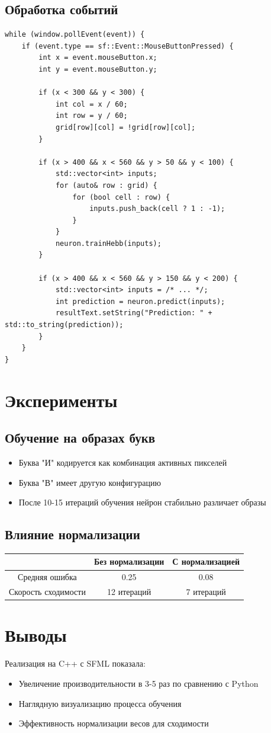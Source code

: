 \documentclass{article}
\begin{document}
\subsection*{Обработка событий}
\begin{lstlisting}
while (window.pollEvent(event)) {
    if (event.type == sf::Event::MouseButtonPressed) {
        int x = event.mouseButton.x;
        int y = event.mouseButton.y;
        
        if (x < 300 && y < 300) {
            int col = x / 60;
            int row = y / 60;
            grid[row][col] = !grid[row][col];
        }
        
        if (x > 400 && x < 560 && y > 50 && y < 100) {
            std::vector<int> inputs;
            for (auto& row : grid) {
                for (bool cell : row) {
                    inputs.push_back(cell ? 1 : -1);
                }
            }
            neuron.trainHebb(inputs);
        }
        
        if (x > 400 && x < 560 && y > 150 && y < 200) {
            std::vector<int> inputs = /* ... */;
            int prediction = neuron.predict(inputs);
            resultText.setString("Prediction: " + std::to_string(prediction));
        }
    }
}
\end{lstlisting}

\section*{Эксперименты}
\subsection*{Обучение на образах букв}
\begin{itemize}
    \item Буква "И" кодируется как комбинация активных пикселей
    \item Буква "В" имеет другую конфигурацию
    \item После 10-15 итераций обучения нейрон стабильно различает образы
\end{itemize}

\subsection*{Влияние нормализации}
\begin{tabular}{|c|c|c|}
\hline
 & Без нормализации & С нормализацией \\
\hline
Средняя ошибка & 0.25 & 0.08 \\
\hline
Скорость сходимости & 12 итераций & 7 итераций \\
\hline
\end{tabular}

\section*{Выводы}
Реализация на C++ с SFML показала:
\begin{itemize}
    \item Увеличение производительности в 3-5 раз по сравнению с Python
    \item Наглядную визуализацию процесса обучения
    \item Эффективность нормализации весов для сходимости
\end{itemize}
\end{document}
